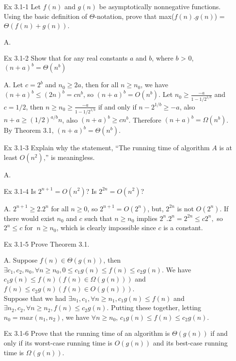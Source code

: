 \documentclass[fontsize=12pt,paper=a4]{book}
\begin{document}
\begin{enumerate}
 \item[Ex 3.1-1]
       Let $f(n)$ and $g(n)$ be asymptotically nonnegative functions. Using the basic definition of $\Theta$-notation, prove that max($f(n).g(n)$) = $\Theta(f(n)+g(n))$.
 \item[A.]
       
 \item[Ex 3.1-2]
       Show that for any real constants $a$ and $b$, where $b$ > 0,\\
       $(n+a)^b = \Theta(n^b)$
 \item[A.]
       Let $c = 2^b$ and $n_0 \geq 2a$, then for all $n \geq n_0$, we have $(n+a)^b \leq (2n)^b = cn^b$, so $(n+a)^b = O(n^b)$. Let $n_0 \geq \frac{-a}{1-1/2^{1/b}}$ and $c = 1/2$, then $n \geq n_0 \geq \frac{-a}{1-1/2^{1/b}}$ if and only if $n-2^{1/b} \geq -a$, also $n+a \geq (1/2)^{a/b}n$, also $(n+a)^b \geq cn^b$. Therefore $(n+a)^b = \Omega(n^b)$. By Theorem 3.1, $(n+a)^b = \Theta(n^b)$.
       
 \item[Ex 3.1-3]
       Explain why the statement, “The running time of algorithm $A$ is at least $O(n^2)$,” is meaningless.
 \item[A.]
       
 \item[Ex 3.1-4]
       Is $2^{n+1} = O(n^2)$? Is $2^{2n} = O(n^2)$?
 \item[A.]
       $2^{n+1} \geq 2 . 2^n$ for all $n \geq 0$, so $2^{n+1} = O(2^n)$, but, $2^{2n}$ is not $O(2^n)$. If there would exist $n_0$ and $c$ such that $n \geq n_0$ implies $2^n . 2^n = 2^{2n} \leq c2^n,$ so $2^n \leq c$ for $\ n \geq n_0$, which is clearly impossible since $c$ is a constant.
       
 \item[Ex 3.1-5]
       Prove Theorem 3.1.
 \item[A.]
       Suppose $f(n) \in \Theta(g(n))$, then $\exists c_1, c_2, n_0, \forall n \geq n_0, 0 \leq c_1g(n) \leq f(n) \leq c_2g(n)$. We have $c_1g(n) \leq f(n)(f(n) \in \Omega(g(n)))$ and $f(n) \leq c_2g(n)(f(n) \in O(g(n)))$.\\
       Suppose that we had $\exists n_1, c_1, \forall n \geq n_1, c_1g(n) \leq f(n)$ and $\exists n_2,c_2,\forall n \geq n_2, f(n) \leq c_2g(n)$. Putting these together, letting $n_0 = max(n_1,n_2)$, we have $\forall n \geq n_0$, $c_1g(n) \leq f(n) \leq c_2g(n)$.
       
 \item[Ex 3.1-6]
       Prove that the running time of an algorithm is $\Theta(g(n))$ if and only if its worst-case running time is $O(g(n))$ and its best-case running time is $\Omega(g(n))$.
       

\end{enumerate}
\end{document}
